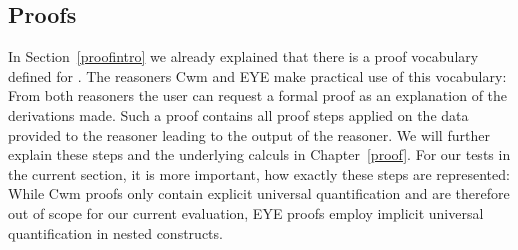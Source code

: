 





\subsection{Proofs}\label{pro}
In Section~\ref{proofintro} we already explained that there is a proof vocabulary defined for \nthree. The reasoners Cwm and EYE 
make practical use of this vocabulary: From both reasoners the user can request a formal proof as an explanation of the derivations made. Such a proof contains 
all proof steps applied on the data provided to the reasoner leading to the output of the reasoner. We will further explain these steps and the underlying calculs in Chapter~\ref{proof}.
For our tests in the current section, it is more important, how exactly these steps are represented:
%
%
While Cwm proofs only contain explicit universal 
quantification and are therefore out of scope for our current evaluation, EYE proofs employ implicit universal quantification in nested constructs. 

